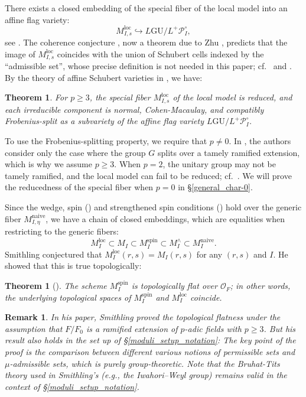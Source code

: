 \documentclass[pdflatex,sn-mathphys-num]{sn-jnl}%
\theoremstyle{thmstyleone}%
\newtheorem{theorem}[subsubsection]{Theorem}%
\theoremstyle{thmstyletwo}%
\newtheorem{remark}[subsubsection]{Remark}%
\numberwithin{equation}{subsection}
\theoremstyle{thmstylethree}%
\newcommand{\CO}{\ensuremath{\mathcal{O}}\xspace}
\newcommand{\CP}{\ensuremath{\mathcal{P}}\xspace}
\newcommand{\GU}{\mathrm{GU}}
\newcommand{\loc}{\ensuremath{\mathrm{loc}}\xspace}
\newcommand{\naive}{\ensuremath{\mathrm{naive}}\xspace}
\newcommand{\spin}{\ensuremath{\mathrm{spin}}\xspace}
\begin{document}
There exists a closed embedding of the special fiber of the local model into an affine flag variety: 
\begin{equation}\label{equ:ebd-lm-to-flag}
M^\loc_{I,s}\hookrightarrow L\GU/L^+\CP_I^\circ,
\end{equation}
see \cite[\S 11]{PR2008}.
The coherence conjecture \cite[\S 4]{PR2009}, now a theorem due to Zhu \cite{Zhu2014}, predicts that the image of $M^\loc_{I,s}$ coincides with the union of Schubert cells indexed by the ``admissible set'', whose precise definition is not needed in this paper; cf.\ \cite[Theorem 11.3]{PR2008} and \cite[Theorem 8.1]{Zhu2014}.
By the theory of affine Schubert varieties in \cite{PR2008}, we have:
\begin{theorem}\label{moduli_fc:coh}
For $p\geq 3$, the special fiber $M^\loc_{I,s}$ of the local model is reduced, and each irreducible component is normal, Cohen-Macaulay, and 
compatibly Frobenius-split as a subvariety of the affine flag variety $L\GU/L^+\CP_I^\circ$.
\end{theorem}
To use the Frobenius-splitting property, we require that $p\neq 0$.
In \cite{PR2008}, the authors consider only the case where the group $G$ splits over a tamely ramified extension, which is why we assume $p\geq 3$. 
When $p=2$, the unitary group may not be tamely ramified, and the local model can fail to be reduced; cf.\ \cite[\S 2.6]{HPR}. We will prove the reducedness of the special fiber when $p=0$ in \S \ref{general_char-0}.
		
Since the wedge, spin (\cite[7.2.2]{PR2009}) and strengthened spin conditions (\cite[\S 2.5]{Smithling2015}) hold over the generic fiber $M^\naive_{I,\eta}$, we have a chain of closed embeddings, which are equalities when restricting to the generic fibers:
\begin{equation*}\label{moduli_fc:closed-immersions}
	M_I^\loc \subset M_I \subset M_I^\spin \subset M_I^\wedge \subset M_I^\naive.
\end{equation*}
Smithling \cite{Smithling2015} conjectured that $M_I^\loc(r,s) = M_I(r,s)$ for any $(r,s)$ and $I$. He showed that this is true topologically:
\begin{theorem}[\cite{Smithling2011,Smithling2014}]\label{moduli_fc:top-flat}
The scheme $M^\spin_I$ is topologically flat over $\CO_F$; in other words, the underlying topological spaces of $M^\spin_I$ and $M_I^\loc$ coincide.	
\end{theorem}
\begin{remark}\label{moduli_topflat:general}
In his paper, Smithling proved the topological flatness under the assumption that $F/F_0$ is a ramified extension of $p$-adic fields with $p\geq 3$. 
But his result also holds in the set up of \S \ref{moduli_setup_notation}: The key point of the proof is the comparison between different various notions of permissible sets and $\mu$-admissible sets, which is purely group-theoretic. 
Note that the Bruhat-Tits theory used in Smithling's (e.g., the Iwahori–Weyl group) remains valid in the context of \S \ref{moduli_setup_notation}.\end{remark}
\end{document}
